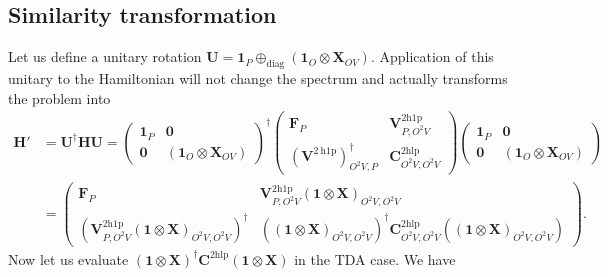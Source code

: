 \subsection{Similarity transformation}
Let us define a unitary rotation $\bm{U} = \bm{1}_P \oplus_{\text{diag}} \left( \bm{1}_O \otimes \bm{X}_{OV} \right)$. Application of this unitary to the Hamiltonian will not change the spectrum and actually transforms the problem into
\begin{align}
    \bm{H}' &= \bm{U}^\dag \bm{H} \bm{U} = \begin{pmatrix} \bm{1}_{P} & \bm{0}\\ \bm{0}&\left( \bm{1}_O \otimes \bm{X }_{OV} \right) \end{pmatrix}^\dag \begin{pmatrix} \bm{F}_P & \bm{V}^{2 \mathrm{h1p}}_{P,O^2V}\\ \left(\bm{V}^{2 \mathrm{~h} 1 \mathrm{p}}\right)^{\dagger}_{O^2V,P} & \bm{C}^{2 \mathrm{hlp}}_{O^2V,O^2V} \end{pmatrix} \begin{pmatrix} \bm{1}_P & \bm{0}\\ \bm{0}&\left( \bm{1}_O \otimes \bm{X }_{OV} \right) \end{pmatrix}\\
& = \begin{pmatrix} \bm{F}_P & \bm{V}^{2 \mathrm{h1p}}_{P,O^2V}\left( \bm{1}\otimes \bm{X }\right)_{O^2V,O^2V}\\ \left(\bm{V}^{2 \mathrm{h1p}}_{P,O^2V}\left( \bm{1} \otimes \bm{X } \right)_{O^2V,O^2V}\right)^{\dagger} & \left( \left( \bm{1} \otimes \bm{X } \right)_{O^2V,O^2V}\right)^\dagger \bm{C}^{2 \mathrm{hlp}}_{O^2V,O^2V} \left( \left( \bm{1} \otimes \bm{X } \right)_{O^2V,O^2V} \right) \end{pmatrix}.
\label{eq:booth_upfolded_hamiltonian}
\end{align}
Now let us evaluate $\left( \bm{1} \otimes \bm{X } \right)^\dagger \bm{C}^{2 \mathrm{hlp}} \left( \bm{1} \otimes \bm{X } \right)$ in the TDA case. We have
